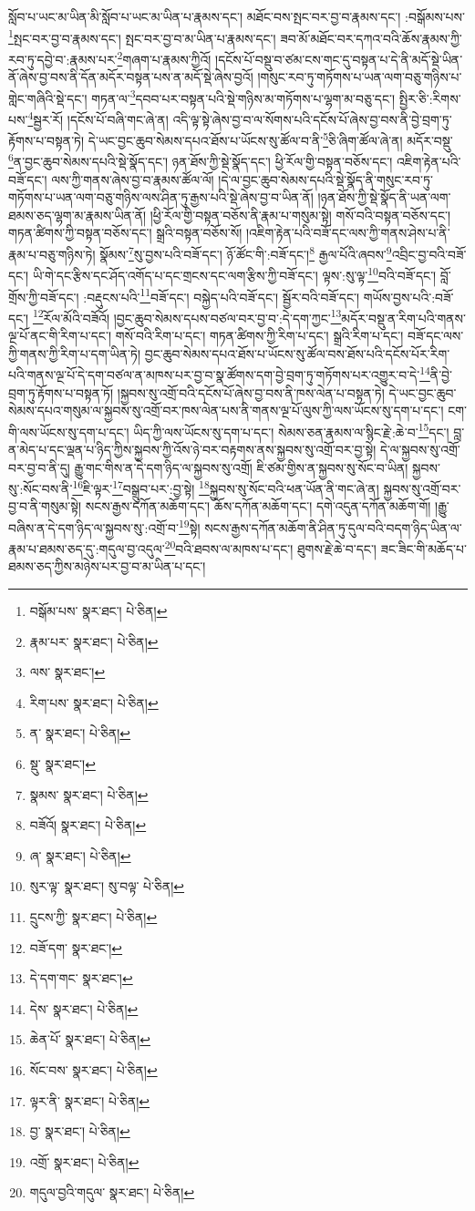 སློབ་པ་ཡང་མ་ཡིན་མི་སློབ་པ་ཡང་མ་ཡིན་པ་རྣམས་དང་། མཐོང་བས་སྤང་བར་བྱ་བ་རྣམས་དང་། :བསྒོམས་པས་\footnote{བསྒོམ་པས་  སྣར་ཐང་།  པེ་ཅིན། }སྤང་བར་བྱ་བ་རྣམས་དང་། སྤང་བར་བྱ་བ་མ་ཡིན་པ་རྣམས་དང་། ཟབ་མོ་མཐོང་བར་དཀའ་བའི་ཆོས་རྣམས་ཀྱི་རབ་ཏུ་དབྱེ་བ་:རྣམས་པར་\footnote{རྣམ་པར་  སྣར་ཐང་།  པེ་ཅིན། }གཞག་པ་རྣམས་ཀྱིའོ། །དངོས་པོ་བསྡུ་བ་ཙམ་ངས་གང་དུ་བསྟན་པ་དེ་ནི་མདོ་སྡེ་ཡིན་ནོ་ཞེས་བྱ་བས་ནི་དོན་མདོར་བསྟན་པས་ན་མདོ་སྡེ་ཞེས་བྱའོ། །གསུང་རབ་ཏུ་གཏོགས་པ་ཡན་ལག་བཅུ་གཉིས་པ་གླེང་གཞིའི་སྡེ་དང་། གཏན་ལ་\footnote{ལས་  སྣར་ཐང་། }དབབ་པར་བསྟན་པའི་སྡེ་གཉིས་མ་གཏོགས་པ་ལྷག་མ་བཅུ་དང་། སྤྱིར་ཅི་:རིགས་པས་\footnote{རིག་པས་  སྣར་ཐང་།  པེ་ཅིན། }སྦྱར་རོ། །དངོས་པོ་བཞི་གང་ཞེ་ན། འདི་ལྟ་སྟེ་ཞེས་བྱ་བ་ལ་སོགས་པའི་དངོས་པོ་ཞེས་བྱ་བས་ནི་བྱེ་བྲག་ཏུ་རྟོགས་པ་བསྟན་ཏེ། དེ་ཡང་བྱང་ཆུབ་སེམས་དཔའ་ཐོས་པ་ཡོངས་སུ་ཚོལ་བ་ནི་\footnote{ན་  སྣར་ཐང་།  པེ་ཅིན། }ཅི་ཞིག་ཚོལ་ཞེ་ན། མདོར་བསྡུ་\footnote{སྡུ་  སྣར་ཐང་། }ན་བྱང་ཆུབ་སེམས་དཔའི་སྡེ་སྣོད་དང་། ཉན་ཐོས་ཀྱི་སྡེ་སྣོད་དང་། ཕྱི་རོལ་གྱི་བསྟན་བཅོས་དང་། འཇིག་རྟེན་པའི་བཟོ་དང་། ལས་ཀྱི་གནས་ཞེས་བྱ་བ་རྣམས་ཚོལ་ལོ། །དེ་ལ་བྱང་ཆུབ་སེམས་དཔའི་སྡེ་སྣོད་ནི་གསུང་རབ་ཏུ་གཏོགས་པ་ཡན་ལག་བཅུ་གཉིས་ལས་ཤིན་ཏུ་རྒྱས་པའི་སྡེ་ཞེས་བྱ་བ་ཡིན་ནོ། །ཉན་ཐོས་ཀྱི་སྡེ་སྣོད་ནི་ཡན་ལག་ཐམས་ཅད་ལྷག་མ་རྣམས་ཡིན་ནོ། །ཕྱི་རོལ་གྱི་བསྟན་བཅོས་ནི་རྣམ་པ་གསུམ་སྟེ། གསོ་བའི་བསྟན་བཅོས་དང་། གཏན་ཚིགས་ཀྱི་བསྟན་བཅོས་དང་། སྒྲའི་བསྟན་བཅོས་སོ། །འཇིག་རྟེན་པའི་བཟོ་དང་ལས་ཀྱི་གནས་ཤེས་པ་ནི་རྣམ་པ་བཅུ་གཉིས་ཏེ། སྣོམས་\footnote{སྣམས་  སྣར་ཐང་།  པེ་ཅིན། }སུ་བྱས་པའི་བཟོ་དང་། ཉོ་ཚོང་གི་:བཟོ་དང་།\footnote{བཟོའོ།  སྣར་ཐང་།  པེ་ཅིན། } རྒྱལ་པོའི་ཞབས་\footnote{ཞ་  སྣར་ཐང་།  པེ་ཅིན། }འབྲིང་བྱ་བའི་བཟོ་དང་། ཡི་གེ་དང་རྩིས་དང་ཤོད་འགོད་པ་དང་གྲངས་དང་ལག་རྩིས་ཀྱི་བཟོ་དང་། ལྟས་:སུ་ལྟ་\footnote{སུར་ལྟ་  སྣར་ཐང་། སུ་བལྟ་  པེ་ཅིན། }བའི་བཟོ་དང་། བློ་གྲོས་ཀྱི་བཟོ་དང་། :བརྡུངས་པའི་\footnote{དྲུངས་ཀྱི་  སྣར་ཐང་།  པེ་ཅིན། }བཟོ་དང་། བསྐྱེད་པའི་བཟོ་དང་། སྦྱོར་བའི་བཟོ་དང་། གཡོས་བྱས་པའི་:བཟོ་དང་། \footnote{བཟོ་དག་  སྣར་ཐང་། }རོལ་མོའི་བཟོའོ། །བྱང་ཆུབ་སེམས་དཔས་བཙལ་བར་བྱ་བ་:དེ་དག་ཀྱང་\footnote{དེ་དག་གང་  སྣར་ཐང་། }མདོར་བསྡུ་ན་རིག་པའི་གནས་ལྔ་པོ་ནང་གི་རིག་པ་དང་། གསོ་བའི་རིག་པ་དང་། གཏན་ཚིགས་ཀྱི་རིག་པ་དང་། སྒྲའི་རིག་པ་དང་། བཟོ་དང་ལས་ཀྱི་གནས་ཀྱི་རིག་པ་དག་ཡིན་ཏེ། བྱང་ཆུབ་སེམས་དཔའ་ཐོས་པ་ཡོངས་སུ་ཚོལ་བས་ཐོས་པའི་དངོས་པོར་རིག་པའི་གནས་ལྔ་པོ་དེ་དག་བཙལ་ན་མཁས་པར་བྱ་བ་སྣ་ཚོགས་དག་བྱེ་བྲག་ཏུ་གཏོགས་པར་འགྱུར་བ་དེ་\footnote{དེས་  སྣར་ཐང་།  པེ་ཅིན། }ནི་བྱེ་བྲག་ཏུ་རྟོགས་པ་བསྟན་ཏོ། །སྐྱབས་སུ་འགྲོ་བའི་དངོས་པོ་ཞེས་བྱ་བས་ནི་ཁས་ལེན་པ་བསྟན་ཏེ། དེ་ཡང་བྱང་ཆུབ་སེམས་དཔའ་གསུམ་ལ་སྐྱབས་སུ་འགྲོ་བར་ཁས་ལེན་པས་ནི་གནས་ལྔ་པོ་ལུས་ཀྱི་ལས་ཡོངས་སུ་དག་པ་དང་། ངག་གི་ལས་ཡོངས་སུ་དག་པ་དང་། ཡིད་ཀྱི་ལས་ཡོངས་སུ་དག་པ་དང་། སེམས་ཅན་རྣམས་ལ་སྙིང་རྗེ་:ཆེ་བ་\footnote{ཆེན་པོ་  སྣར་ཐང་།  པེ་ཅིན། }དང་། བླ་ན་མེད་པ་དང་ལྡན་པ་ཉིད་ཀྱིས་སྐྱབས་ཀྱི་འོས་ཉེ་བར་བརྟགས་ནས་སྐྱབས་སུ་འགྲོ་བར་བྱ་སྟེ། དེ་ལ་སྐྱབས་སུ་འགྲོ་བར་བྱ་བ་ནི་དུ། རྒྱུ་གང་གིས་ན་དེ་དག་ཉིད་ལ་སྐྱབས་སུ་འགྲོ། ཇི་ཙམ་གྱིས་ན་སྐྱབས་སུ་སོང་བ་ཡིན། སྐྱབས་སུ་:སོང་བས་ནི་\footnote{སོང་བས་  སྣར་ཐང་།  པེ་ཅིན། }ཇི་ལྟར་\footnote{ལྟར་ནི་  སྣར་ཐང་།  པེ་ཅིན། }བསྒྲུབ་པར་:བྱ་སྟེ། \footnote{བྱ་  སྣར་ཐང་།  པེ་ཅིན། }སྐྱབས་སུ་སོང་བའི་ཕན་ཡོན་ནི་གང་ཞེ་ན། སྐྱབས་སུ་འགྲོ་བར་བྱ་བ་ནི་གསུམ་སྟེ། སངས་རྒྱས་དཀོན་མཆོག་དང་། ཆོས་དཀོན་མཆོག་དང་། དགེ་འདུན་དཀོན་མཆོག་གོ། །རྒྱུ་བཞིས་ན་དེ་དག་ཉིད་ལ་སྐྱབས་སུ་:འགྲོ་བ་\footnote{འགྲོ་  སྣར་ཐང་།  པེ་ཅིན། }སྟེ། སངས་རྒྱས་དཀོན་མཆོག་ནི་ཤིན་ཏུ་དུལ་བའི་བདག་ཉིད་ཡིན་ལ་རྣམ་པ་ཐམས་ཅད་དུ་:གདུལ་བྱ་འདུལ་\footnote{གདུལ་བྱའི་གདུལ་  སྣར་ཐང་།  པེ་ཅིན། }བའི་ཐབས་ལ་མཁས་པ་དང་། ཐུགས་རྗེ་ཆེ་བ་དང་། ཟང་ཟིང་གི་མཆོད་པ་ཐམས་ཅད་ཀྱིས་མཉེས་པར་བྱ་བ་མ་ཡིན་པ་དང་། 